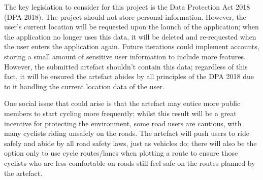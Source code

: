 The key legislation to consider for this project is the Data Protection Act 2018 (DPA 2018). The project should not store personal information. However, the user’s current location will be requested upon the launch of the application; when the application no longer uses this data, it will be deleted and re-requested when the user enters the application again. Future iterations could implement accounts, storing a small amount of sensitive user information to include more features. However, the submitted artefact shouldn’t contain this data; regardless of this fact, it will be ensured the artefact abides by all principles of the DPA 2018 due to it handling the current location data of the user.

One social issue that could arise is that the artefact may entice more public members to start cycling more frequently; whilst this result will be a great incentive for protecting the environment, some road users are cautious, with many cyclists riding unsafely on the roads. The artefact will push users to ride safely and abide by all road safety laws, just as vehicles do; there will also be the option only to use cycle routes/lanes when plotting a route to ensure those cyclists who are less comfortable on roads still feel safe on the routes planned by the artefact.